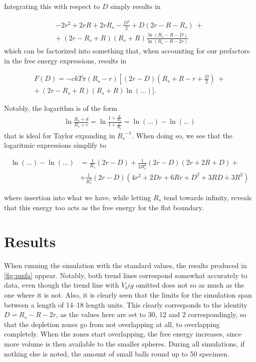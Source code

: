 \documentclass[a4paper,12pt]{article}
\theoremstyle{plain}
\theoremstyle{definition}
\begin{document}
   Integrating this with respect to $D$ simply results in 

   \begin{align*}
       -2r^2 + 2rR + 2rR_s - \frac{D^2}{2} + D(2r-R-R_s)~+ \\
      +~(2r-R_s+R)(R_s + R) \frac{\ln(R_s-R-D)}{\ln(R_s-R-2r)}
   \end{align*}
   which can be factorized into something that, when accounting for our
   prefactors in the free energy expressions, results in 

   \begin{align}
      F(D) = -ckT\pi (R_s-r)\left[ (2r-D)\left( R_s+R-r +
      \frac{D}{2}\right)\right.~+ \nonumber \\ 
      +~(2r-R_s+R)(R_s+R)\ln(\ldots)\bigg].
      \label{eq:free_en_spherical}
   \end{align}
   
   Notably, the logarithm is of the form 
   \begin{align*}
      \ln\frac{R_s + d}{R_s + c} = \ln\frac{1 + \frac{d}{R_s}}{1 +
      \frac{c}{R_s}} = \ln(\ldots) - \ln(\ldots)
   \end{align*}
   that is ideal for Taylor expanding in ${R_s}^{-1}$. When doing so, we see
   that the logaritmic expressions simplify to 

   \begin{align*}
      \ln(\ldots) - \ln(\ldots) &= \frac{1}{R_s}(2r-D) +
      \frac{1}{2R_s^2}(2r-D)(2r+2R+D) + \\ &+\frac{1}{R_s^3}(2r-D)(4r^2 + 2Dr + 6Rr +
      D^2 + 3RD + 3R^2)
   \end{align*}

   where insertion into what we have, while letting $R_s$ tend towards infinity, 
   reveals that this energy too acts as the free energy for the flat boundary.

\section{Results}
   
   When running the simulation with the standard values, the results produced in
   \cref{fig:pmfa} appear. Notably, both trend lines correspond somewhat
   accurately to data, even though the trend line with $V_big$ omitted does not
   so as much as the one where it is not. Also, it is clearly seen that the
   limits for the simulation span between a length of 14--18 length units. This
   clearly corresponds to the identity $D = R_s - R - 2r$, as the values
   here are set to 30, 12 and 2 correspondingly, so that the depletion zones go
   from not overlapping at all, to overlapping completely. When the zones start
   overlapping, the free energy increases, since more volume is then available
   to the smaller spheres. During all simulations, if nothing else is noted, the
   amount of small balls round up to 50 specimen. 
  
\end{document}
